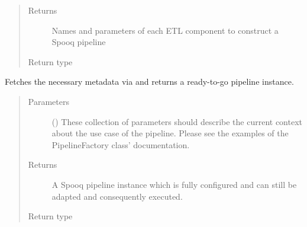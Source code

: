 \documentclass[a4paper,10pt, twoside,english]{sphinxmanual}
\begin{document}
\begin{fulllineitems}
\begin{fulllineitems}
\begin{quote}
\begin{description}
\item[{Returns}] \leavevmode
Names and parameters of each ETL component to construct a Spooq pipeline

\item[{Return type}] \leavevmode
{}

\end{description}\end{quote}

\end{fulllineitems}


\begin{fulllineitems}
\label{\detokenize{pipeline/pipeline_factory:spooq2.pipeline.factory.PipelineFactory.get_pipeline}}
Fetches the necessary metadata via {\hyperref[\detokenize{pipeline/pipeline_factory:spooq2.pipeline.factory.PipelineFactory.get_metadata}]{}} and
returns a ready-to-go pipeline instance.
\begin{quote}\begin{description}
\item[{Parameters}] \leavevmode
{} () \textendash{} These collection of parameters should describe the current context about the use case
of the pipeline. Please see the examples of the PipelineFactory class’
documentation.

\item[{Returns}] \leavevmode
A Spooq pipeline instance which is fully configured and can still be
adapted and consequently executed.

\item[{Return type}] \leavevmode
{}

\end{description}\end{quote}

\end{fulllineitems}


\end{fulllineitems}
\end{document}
